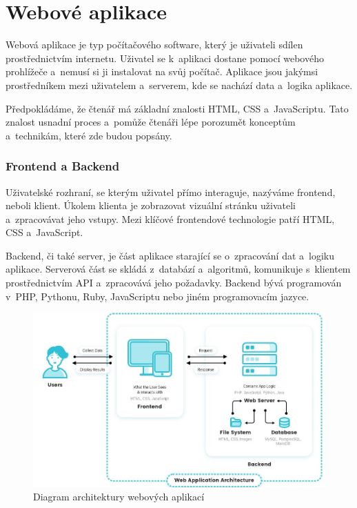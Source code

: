 \section{Webové aplikace}

Webová aplikace je typ počítačového software, který je uživateli sdílen prostřednictvím internetu. 
Uživatel se k~aplikaci dostane pomocí webového prohlížeče a~nemusí si ji instalovat na svůj počítač. 
Aplikace jsou jakýmsi prostředníkem mezi uživatelem a~serverem, kde se nachází data a~logika aplikace.\cite{codeacademywebapp}

Předpokládáme, že čtenář má základní znalosti HTML, CSS a~JavaScriptu. 
Tato znalost usnadní proces a~pomůže čtenáři lépe porozumět konceptům a~technikám, které zde budou popsány.

\subsubsection*{Frontend a Backend}

Uživatelské rozhraní, se kterým uživatel přímo interaguje, nazýváme frontend, neboli klient.
Úkolem klienta je zobrazovat vizuální stránku uživateli a~zpracovávat jeho vstupy. 
Mezi klíčové frontendové technologie patří HTML, CSS a~JavaScript.

Backend, či také server, je část aplikace starající se o~zpracování dat a~logiku aplikace. 
Serverová část se skládá z~databází a~algoritmů, komunikuje s~klientem prostřednictvím API a~zpracovává jeho požadavky. 
Backend bývá programován v~PHP, Pythonu, Ruby, JavaScriptu nebo jiném programovacím jazyce.\cite{stateofartframeworks}

\begin{figure}[htb]
	\centering
		\includegraphics[width=.95\textwidth]{images/webapparchitecture.jpg}
	\caption[Diagram architektury webových aplikací]{Diagram architektury webových aplikací \cite{webappsarchitecture}}
	\label{fig:webappsarchitecture}
\end{figure}

